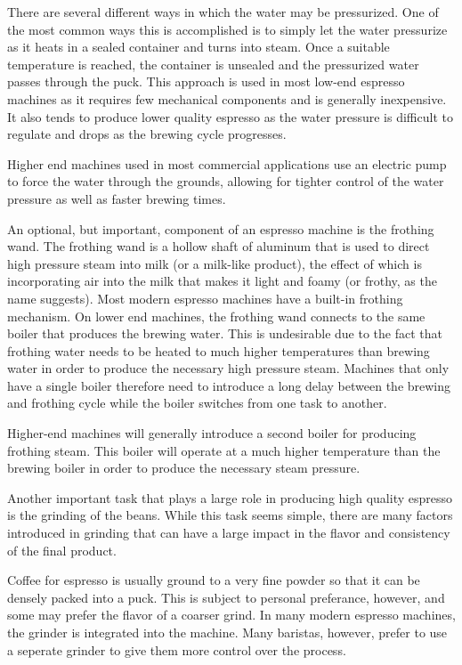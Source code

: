 \documentclass[conference]{IEEEtran}
\begin{document}
There are several different ways in which the water may be pressurized. One of
the most common ways this is accomplished is to simply let the water pressurize
as it heats in a sealed container and turns into steam. Once a suitable
temperature is reached, the container is unsealed and the pressurized water
passes through the puck. This approach is used in most low-end espresso machines
as it requires few mechanical components and is generally inexpensive. It also
tends to produce lower quality espresso as the water pressure is difficult to
regulate and drops as the brewing cycle progresses.

Higher end machines used in most commercial applications use an electric pump to
force the water through the grounds, allowing for tighter control of the
water pressure as well as faster brewing times.

An optional, but important, component of an espresso machine is the frothing
wand. The frothing wand is a hollow shaft of aluminum that is used to direct
high pressure steam into milk (or a milk-like product), the effect of which is
incorporating air into the milk that makes it light and foamy (or frothy, as
the name suggests). Most modern espresso machines have a built-in frothing
mechanism. On lower end machines, the frothing wand connects to the same boiler
that produces the brewing water. This is undesirable due to the fact that
frothing water needs to be heated to much higher temperatures than brewing water
in order to produce the necessary high pressure steam. Machines that only have a
single boiler therefore need to introduce a long delay between the brewing and
frothing cycle while the boiler switches from one task to another.

Higher-end machines will generally introduce a second boiler for producing
frothing steam. This boiler will operate at a much higher temperature than the
brewing boiler in order to produce the necessary steam pressure.

Another important task that plays a large role in
producing high quality espresso is the grinding of the beans. While this task
seems simple, there are many factors introduced in grinding that can have a
large impact in the flavor and consistency of the final product. 

Coffee for espresso is usually ground to a very fine powder so that it can be
densely packed into a puck. This is subject to personal preferance, however, and
some may prefer the flavor of a coarser grind. In many modern espresso machines, the
grinder is integrated into the machine. Many baristas, however, prefer to use a
seperate grinder to give them more control over the process.
\end{document}
